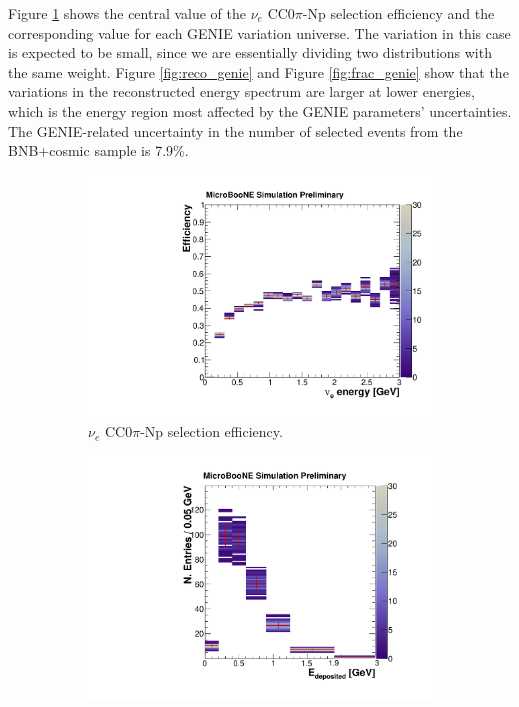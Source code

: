 Figure \ref{fig:eff_genie} shows the central value of the $\nu_{e}$ CC0$\pi$-Np selection efficiency and the corresponding value for each GENIE variation universe. The variation in this case is expected to be small, since we are essentially dividing two distributions with the same weight. Figure \ref{fig:reco_genie} and Figure \ref{fig:frac_genie} show that the variations in the reconstructed energy spectrum are larger at lower energies, which is the energy region most affected by the GENIE parameters' uncertainties. The GENIE-related uncertainty in the number of selected events from the BNB+cosmic sample is 7.9\%.

\begin{figure}[htbp]
  \begin{center}
    \begin{subfigure}{0.48\textwidth}
      \includegraphics[width=\linewidth]{figures/eff_ene_genie.pdf}
      \caption{$\nu_{e}$ CC0$\pi$-Np selection efficiency.}  \label{fig:eff_genie}
    \end{subfigure}\hfill
    \begin{subfigure}{0.48\textwidth}
      \includegraphics[width=\linewidth]{figures/reco_genie.pdf}

\end{subfigure}
\end{center}
\end{figure}

